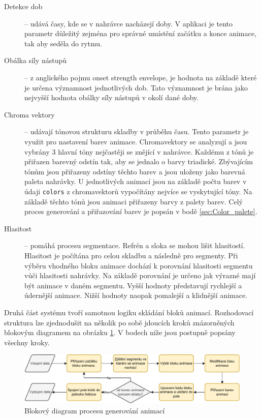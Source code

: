 \begin{description}
    \item[Detekce dob] -- udává časy, kde se v nahrávce nacházejí doby. V aplikaci je tento parametr důležitý zejména pro správné umístění začátku a konce animace, tak aby seděla do rytmu. 

    \item[Obálka síly nástupů] -- z anglického pojmu onset strength envelope, je hodnota na základě které je určena významnost jednotlivých dob. Tato významnost je brána jako nejvyšší hodnota obálky síly nástupů v okolí dané doby.
     
    \item[Chroma vektory] -- udávají tónovou strukturu skladby v průběhu času. Tento parametr je využit pro nastavení barev animace. Chromavektory se analyzují a jsou vybrány 3 hlavní tóny nejčastěji se znějící v nahrávce. Každému z tónů je přiřazen barevný odstín tak, aby se jednalo o barvy triadické. Zbývajícím tónům jsou přiřazeny odstíny těchto barev a jsou uloženy jako barevná paleta nahrávky. U jednotlivých animací jsou na základě počtu barev v údaji \texttt{colors} z chromavektorů vypočítány nejvíce se vyskytující tóny. Na základě těchto tónů jsou animaci přiřazeny barvy z palety barev. Celý proces generování a přiřazování barev je popsán v bodě \ref{sec:Color_palete}.

    \item[Hlasitost] -- pomáhá procesu segmentace. Refrén a sloka se mohou lišit hlasitostí. Hlasitost je počítána pro celou skladbu a následně pro segmenty. Při výběru vhodného bloku animace dochází k porovnání hlasitosti segmentu vůči hlasitosti nahrávky. Na základě porovnání je určeno jak výrazné mají být animace v daném segmentu. Vyšší hodnoty představují rychlejší a údernější animace. Nižší hodnoty naopak pomalejší a klidnější animace.
\end{description}


Druhá část systému tvoří samotnou logiku skládání bloků animací. Rozhodovací struktura lze zjednodušit na několik po sobě jdoucích kroků znázorněných blokovým diagramem na obrázku \ref{fig:diagram_procesu_generovani_animaci}. V bodech níže jsou postupně popsány všechny kroky.

\begin{figure}[H]
    \centering
    \includegraphics[width = 1\linewidth]{obrazky/UML_diagramy_anim_generation_process.pdf}
    \caption{Blokový diagram procesu generování animací}
    \label{fig:diagram_procesu_generovani_animaci}
\end{figure}

